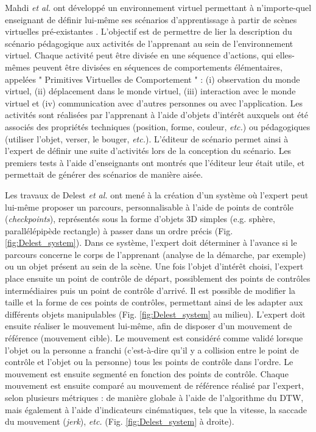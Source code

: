Mahdi \textit{et al.} ont développé un environnement virtuel permettant à n'importe-quel enseignant de définir lui-même ses scénarios d'apprentissage à partir de scènes virtuelles pré-existantes \parencite{Mahdi2019TaE}. L'objectif est de permettre de lier la description du scénario pédagogique aux activités de l'apprenant au sein de l'environnement virtuel. Chaque activité peut être divisée en une séquence d'actions, qui elles-mêmes peuvent être divisées en séquences de comportements élémentaires, appelées " Primitives Virtuelles de Comportement " : (i) observation du monde virtuel, (ii) déplacement dans le monde virtuel, (iii) interaction avec le monde virtuel et (iv) communication avec d'autres personnes ou avec l'application. Les activités sont réalisées par l'apprenant à l'aide d'objets d'intérêt auxquels ont été associés des propriétés techniques (position, forme, couleur, \textit{etc.}) ou pédagogiques (utiliser l'objet, verser, le bouger, \textit{etc.}). L'éditeur de scénario permet ainsi à l'expert de définir une suite d'activités lors de la conception du scénario. Les premiers tests à l'aide d'enseignants ont montrés que l'éditeur leur était utile, et permettait de générer des scénarios de manière aisée.

Les travaux de Delest \textit{et al.} ont mené à la création d'un système où l'expert peut lui-même proposer un parcours, personnalisable à l'aide de points de contrôle (\textit{checkpoints}), représentés sous la forme d'objets 3D simples (e.g. sphère, parallélépipède rectangle) à passer dans un ordre précis \parencite{Delest2019MaE} (Fig. \ref{fig:Delest_system}). Dans ce système, l'expert doit déterminer à l'avance si le parcours concerne le corps de l'apprenant (analyse de la démarche, par exemple) ou un objet présent au sein de la scène. Une fois l'objet d'intérêt choisi, l'expert place ensuite un point de contrôle de départ, possiblement des points de contrôles intermédiaires puis un point de contrôle d'arrivé. Il est possible de modifier la taille et la forme de ces points de contrôles, permettant ainsi de les adapter aux différents objets manipulables (Fig. \ref{fig:Delest_system} au milieu). L'expert doit ensuite réaliser le mouvement lui-même, afin de disposer d'un mouvement de référence (mouvement cible). Le mouvement est considéré comme validé lorsque l'objet ou la personne a franchi (c'est-à-dire qu'il y a collision entre le point de contrôle et l'objet ou la personne) tous les points de contrôle dans l'ordre. Le mouvement est ensuite segmenté en fonction des points de contrôle. Chaque mouvement est ensuite comparé au mouvement de référence réalisé par l'expert, selon plusieurs métriques : de manière globale à l'aide de l'algorithme du DTW, mais également à l'aide d'indicateurs cinématiques, tels que la vitesse, la saccade du mouvement (\textit{jerk}), \textit{etc.} (Fig. \ref{fig:Delest_system} à droite).

